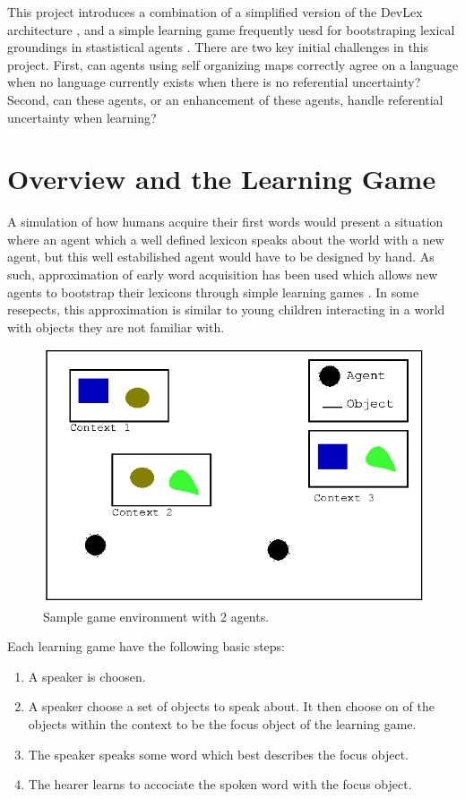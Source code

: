 \documentclass[a4paper,11pt]{article}
\begin{document}
This project introduces a combination of a simplified version of the DevLex
architecture \cite{LiDevLex}, and a simple learning game frequently uesd for
bootstraping lexical groundings in stastistical agents
\cite{VogtLearningSim,VogtSocial}.  There are two key initial challenges in this
project.  First, can agents using self organizing maps correctly agree on a
language when no language currently exists when there is no referential
uncertainty?  Second, can these agents, or an enhancement of these agents,
handle referential uncertainty when learning?

\section{Overview and the Learning Game}
A simulation of how humans acquire their first words would present a situation
where an agent which a well defined lexicon speaks about the world with a new
agent, but this well estabilished agent would have to be designed by hand.  As
such, approximation of early word acquisition has been used which allows new
agents to bootstrap their lexicons through simple learning games
\cite{VogtLearningSim,VogtSocial}.  In some resepects, this approximation is
similar to young children interacting in a world with objects they are not
familiar with.  

\begin{figure} \center \includegraphics[width=.49\textwidth]{game-env.eps}
\caption{Sample game environment with 2 agents.} \label{fig:game-env}
\end{figure}

Each learning game have the following basic steps:

\begin{enumerate}

\item A speaker is choosen.

\item A speaker choose a set of objects to speak about.  It then choose on of
the objects within the context to be the focus object of the learning game.

\item The speaker speaks some word which best describes the focus object.

\item The hearer learns to accociate the spoken word with the focus object.

\end{enumerate}
\end{document}
